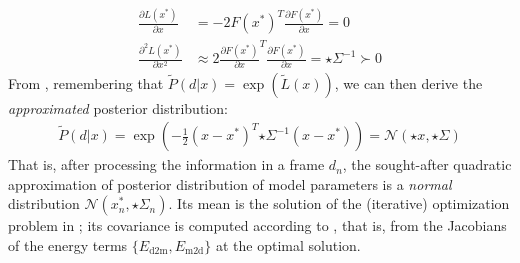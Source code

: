 %
\begin{align}
\tfrac{\partial L(x^*)}{\partial x} &= - 2 F(x^*)^T 
\tfrac{\partial F(x^*)}{\partial x} = 0 
\label{eq:taylor-jacobian}
\\
\tfrac{\partial^2 L(x^*)}{\partial x^2} 
& \approx 2 \tfrac{\partial F(x^*)}{\partial x}^T \tfrac{\partial F(x^*)}{\partial x}
= {\star{\Sigma}}^{-1} \succ 0
\label{eq:taylor-hessian}
\end{align}
% 
From , remembering that $\tilde P(d|x) = \exp (\tilde{L}(x))$, we can then derive the \emph{approximated} posterior distribution:
%
\begin{align}
\tilde{P}(d|x) = \exp\left(- \tfrac{1}{2}(x - x^*)^T {\star{\Sigma}}^{-1}  (x - x^*) \right) = \mathcal{N}\left(\star{x}, \star{\Sigma} \right)
\end{align}
%
That is, after processing the information in a frame $d_n$, the sought-after quadratic approximation of posterior distribution of model parameters is a \emph{normal} distribution $\mathcal{N}\left(x_n^*, \star\Sigma_n \right)$.
Its mean is the solution of the (iterative) optimization problem in ; its covariance is computed according to , that is, from the Jacobians of the energy terms $\{E_{\text{d2m}}, E_{\text{m2d}}\}$ at the optimal solution.



